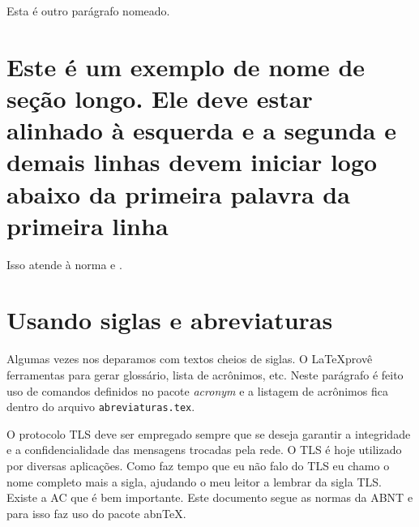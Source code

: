 Esta é outro parágrafo nomeado.

\section{Este é um exemplo de nome de seção longo. Ele deve estar
alinhado à esquerda e a segunda e demais linhas devem iniciar logo abaixo da
primeira palavra da primeira linha}

Isso atende à norma  
 e .


\section{Usando siglas e abreviaturas}

Algumas vezes nos deparamos com textos cheios de siglas. O \LaTeX provê ferramentas para gerar glossário, lista de acrônimos, etc. Neste parágrafo é feito uso de comandos definidos no pacote \textit{acronym} e a listagem de acrônimos fica dentro do arquivo \texttt{abreviaturas.tex}.

O protocolo \ac{TLS} deve ser empregado sempre que se deseja garantir a integridade e a confidencialidade das mensagens trocadas pela rede. O \ac{TLS} é hoje utilizado por diversas aplicações. Como faz tempo que eu não falo do \acf{TLS} eu chamo o nome completo mais a sigla, ajudando o meu leitor a lembrar da sigla \ac{TLS}. Existe a \ac{AC} que é bem importante. Este documento segue as normas da \ac{ABNT} e para isso faz uso do pacote \ac{abnTeX}.